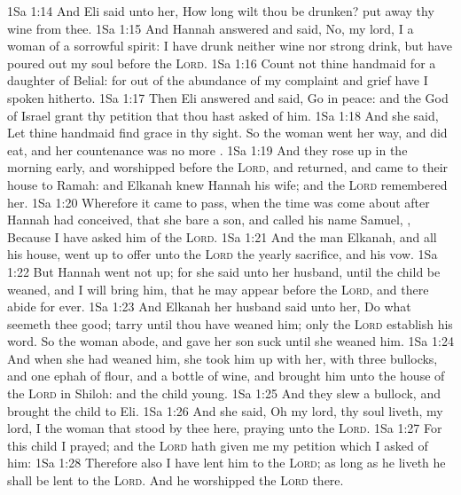 \vs 1Sa 1:14 And Eli said unto her, How long wilt thou be drunken? put away thy wine from thee.
\vs 1Sa 1:15 And Hannah answered and said, No, my lord, I  a woman of a sorrowful spirit: I have drunk neither wine nor strong drink, but have poured out my soul before the \textsc{Lord}.
\vs 1Sa 1:16 Count not thine handmaid for a daughter of Belial: for out of the abundance of my complaint and grief have I spoken hitherto.
\vs 1Sa 1:17 Then Eli answered and said, Go in peace: and the God of Israel grant  thy petition that thou hast asked of him.
\vs 1Sa 1:18 And she said, Let thine handmaid find grace in thy sight. So the woman went her way, and did eat, and her countenance was no more .
\vs 1Sa 1:19 And they rose up in the morning early, and worshipped before the \textsc{Lord}, and returned, and came to their house to Ramah: and Elkanah knew Hannah his wife; and the \textsc{Lord} remembered her.
\vs 1Sa 1:20 Wherefore it came to pass, when the time was come about after Hannah had conceived, that she bare a son, and called his name Samuel, , Because I have asked him of the \textsc{Lord}.
\vs 1Sa 1:21 And the man Elkanah, and all his house, went up to offer unto the \textsc{Lord} the yearly sacrifice, and his vow.
\vs 1Sa 1:22 But Hannah went not up; for she said unto her husband,  until the child be weaned, and  I will bring him, that he may appear before the \textsc{Lord}, and there abide for ever.
\vs 1Sa 1:23 And Elkanah her husband said unto her, Do what seemeth thee good; tarry until thou have weaned him; only the \textsc{Lord} establish his word. So the woman abode, and gave her son suck until she weaned him.
\vs 1Sa 1:24 And when she had weaned him, she took him up with her, with three bullocks, and one ephah of flour, and a bottle of wine, and brought him unto the house of the \textsc{Lord} in Shiloh: and the child  young.
\vs 1Sa 1:25 And they slew a bullock, and brought the child to Eli.
\vs 1Sa 1:26 And she said, Oh my lord,  thy soul liveth, my lord, I  the woman that stood by thee here, praying unto the \textsc{Lord}.
\vs 1Sa 1:27 For this child I prayed; and the \textsc{Lord} hath given me my petition which I asked of him:
\vs 1Sa 1:28 Therefore also I have lent him to the \textsc{Lord}; as long as he liveth he shall be lent to the \textsc{Lord}. And he worshipped the \textsc{Lord} there.
